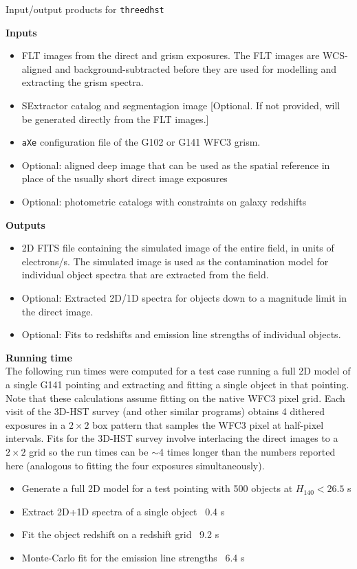 \documentclass[preprint]{aastex}
\begin{document}
\centerline{Input/output products for \texttt{threedhst}}
\noindent \textbf{Inputs}
\begin{itemize}
\item  FLT images from the direct and grism exposures.  The FLT images are WCS-aligned and background-subtracted before they are used for modelling and extracting the grism spectra.
\item SExtractor catalog and segmentagion image [Optional.  If not provided, will be generated directly from the FLT images.]
\item \texttt{aXe} configuration file of the G102 or G141 WFC3 grism.
\item Optional: aligned deep image that can be used as the spatial reference in place of the usually short direct image exposures
\item Optional: photometric catalogs with constraints on galaxy redshifts
\end{itemize}
\textbf{Outputs}
\begin{itemize}
\item 2D FITS file containing the simulated image of the entire field, in units of electrons/s.  The simulated image is used as the contamination model for individual object spectra that are extracted from the field.
\item Optional: Extracted 2D/1D spectra for objects down to a magnitude limit in the direct image.
\item Optional: Fits to redshifts and emission line strengths of individual objects.
\end{itemize}
\textbf{Running time} \\
The following run times were computed for a test case running a full 2D model of a single G141 pointing and extracting and fitting a single object in that pointing.  Note that these calculations assume fitting on the native WFC3 pixel grid.  Each visit of the 3D-HST survey (and other similar programs) obtains 4 dithered exposures in a $2\times2$ box pattern that samples the WFC3 pixel at half-pixel intervals.  Fits for the 3D-HST survey involve interlacing the direct images to a $2\times2$ grid so the run times can be $\sim$4 times longer than the numbers reported here (analogous to fitting the four exposures simultaneously).
\begin{itemize}
\item Generate a full 2D model for a test pointing with 500 objects at $H_{140} < 26.5$  s
\item Extract 2D+1D spectra of a single object \dotfill\ 0.4 s
\item Fit the object redshift on a redshift grid \dotfill\ 9.2 s
\item Monte-Carlo fit for the emission line strengths \dotfill\ 6.4 s
\end{itemize}
\end{document}

